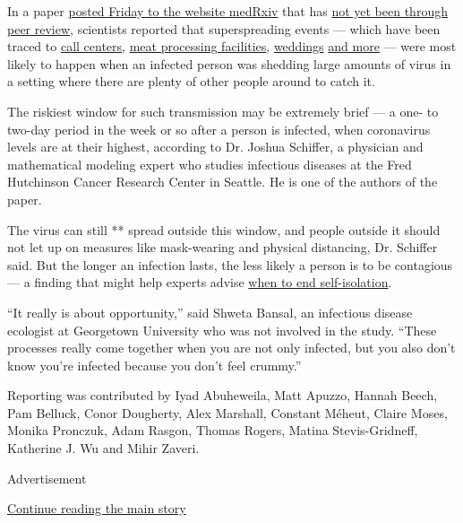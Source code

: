 In a paper
\href{https://www.medrxiv.org/content/10.1101/2020.08.07.20169920v1.full.pdf}{posted
Friday to the website medRxiv} that has
\href{https://www.nytimes.com/2020/04/14/science/coronavirus-disinformation.html}{not
yet been through peer review}, scientists reported that superspreading
events --- which have been traced to
\href{https://wwwnc.cdc.gov/eid/article/26/8/20-1274_article}{call
centers},
\href{https://www.nytimes.com/2020/04/15/us/coronavirus-south-dakota-meat-plant-refugees.html}{meat
processing facilities},
\href{https://wwwnc.cdc.gov/eid/article/26/9/20-1469_article?deliveryName=USCDC_333-DM28908}{weddings}
\href{https://www.nytimes.com/2020/03/30/us/coronavirus-funeral-albany-georgia.html}{and
more} --- were most likely to happen when an infected person was
shedding large amounts of virus in a setting where there are plenty of
other people around to catch it.

The riskiest window for such transmission may be extremely brief --- a
one- to two-day period in the week or so after a person is infected,
when coronavirus levels are at their highest, according to Dr. Joshua
Schiffer, a physician and mathematical modeling expert who studies
infectious diseases at the Fred Hutchinson Cancer Research Center in
Seattle. He is one of the authors of the paper.

The virus can still ** spread outside this window, and people outside it
should not let up on measures like mask-wearing and physical distancing,
Dr. Schiffer said. But the longer an infection lasts, the less likely a
person is to be contagious --- a finding that might help experts advise
\href{https://www.nytimes.com/2020/07/22/health/coronavirus-isolation-testing.html}{when
to end self-isolation}.

``It really is about opportunity,'' said Shweta Bansal, an infectious
disease ecologist at Georgetown University who was not involved in the
study. ``These processes really come together when you are not only
infected, but you also don't know you're infected because you don't feel
crummy.''

Reporting was contributed by Iyad Abuheweila, Matt Apuzzo, Hannah Beech,
Pam Belluck, Conor Dougherty, Alex Marshall, Constant Méheut, Claire
Moses, Monika Pronczuk, Adam Rasgon, Thomas Rogers, Matina
Stevis-Gridneff, Katherine J. Wu and Mihir Zaveri.

Advertisement

\protect\hyperlink{after-bottom}{Continue reading the main story}

